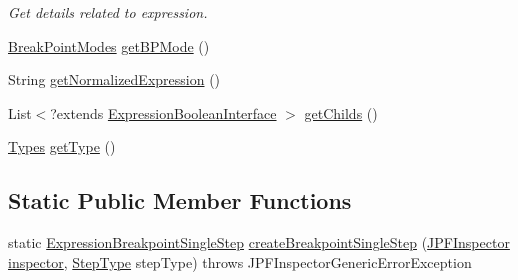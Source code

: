 \begin{DoxyCompactItemize}
\begin{DoxyCompactList}\small\item\em Get details related to expression. \end{DoxyCompactList}\item 
\hyperlink{enumgov_1_1nasa_1_1jpf_1_1inspector_1_1server_1_1breakpoints_1_1_break_point_modes}{Break\+Point\+Modes} \hyperlink{classgov_1_1nasa_1_1jpf_1_1inspector_1_1server_1_1expression_1_1expressions_1_1_expression_breakpoint_single_step_a1c1441ec9e9ff70bac9aac05167bd584}{get\+B\+P\+Mode} ()
\item 
String \hyperlink{classgov_1_1nasa_1_1jpf_1_1inspector_1_1server_1_1expression_1_1expressions_1_1_expression_breakpoint_single_step_af2f0666b7f1430843a3e17429aef05c4}{get\+Normalized\+Expression} ()
\item 
List$<$?extends \hyperlink{interfacegov_1_1nasa_1_1jpf_1_1inspector_1_1server_1_1expression_1_1_expression_boolean_interface}{Expression\+Boolean\+Interface} $>$ \hyperlink{classgov_1_1nasa_1_1jpf_1_1inspector_1_1server_1_1expression_1_1_expression_boolean_leaf_aa99bf3cf13bd8cc1d6c33208bc83b185}{get\+Childs} ()
\item 
\hyperlink{enumgov_1_1nasa_1_1jpf_1_1inspector_1_1server_1_1expression_1_1_types}{Types} \hyperlink{classgov_1_1nasa_1_1jpf_1_1inspector_1_1server_1_1expression_1_1_expression_boolean_aed010ff8683eb1e8621e226703133457}{get\+Type} ()
\end{DoxyCompactItemize}
\subsection*{Static Public Member Functions}
\begin{DoxyCompactItemize}
\item 
static \hyperlink{classgov_1_1nasa_1_1jpf_1_1inspector_1_1server_1_1expression_1_1expressions_1_1_expression_breakpoint_single_step}{Expression\+Breakpoint\+Single\+Step} \hyperlink{classgov_1_1nasa_1_1jpf_1_1inspector_1_1server_1_1expression_1_1expressions_1_1_expression_breakpoint_single_step_adb34270a2a302c3d3b07cfd7421ff5c6}{create\+Breakpoint\+Single\+Step} (\hyperlink{classgov_1_1nasa_1_1jpf_1_1inspector_1_1server_1_1jpf_1_1_j_p_f_inspector}{J\+P\+F\+Inspector} \hyperlink{classgov_1_1nasa_1_1jpf_1_1inspector_1_1server_1_1expression_1_1expressions_1_1_expression_breakpoint_single_step_ae63a59368500e841baaeafb3eea51ed1}{inspector}, \hyperlink{enumgov_1_1nasa_1_1jpf_1_1inspector_1_1interfaces_1_1_commands_interface_1_1_step_type}{Step\+Type} step\+Type)  throws J\+P\+F\+Inspector\+Generic\+Error\+Exception 
\end{DoxyCompactItemize}
